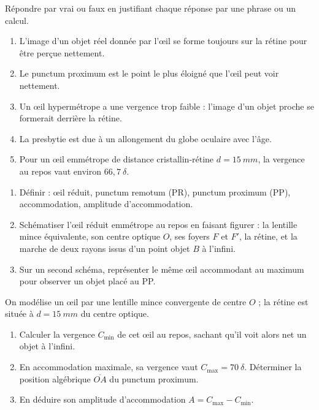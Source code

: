 \documentclass[11pt]{article}
\begin{document}
\begin{exercice}
Répondre par vrai ou faux en justifiant chaque réponse par une phrase ou un calcul.
\begin{enumerate}
\item L'image d'un objet réel donnée par l'œil se forme toujours sur la rétine pour être perçue nettement.
\item Le punctum proximum est le point le plus éloigné que l'œil peut voir nettement.
\item Un œil hypermétrope a une vergence trop faible : l'image d'un objet proche se formerait derrière la rétine.
\item La presbytie est due à un allongement du globe oculaire avec l'âge.
\item Pour un œil emmétrope de distance cristallin-rétine $d = \SI{15}{mm}$, la vergence au repos vaut environ $66,7\ \delta$.
\end{enumerate}
\end{exercice}

\begin{exercice}
\begin{enumerate}
\item Définir : œil réduit, punctum remotum (PR), punctum proximum (PP), accommodation, amplitude d'accommodation.
\item Schématiser l'œil réduit emmétrope au repos en faisant figurer : la lentille mince équivalente, son centre optique $O$, ses foyers $F$ et $F'$, la rétine, et la marche de deux rayons issus d'un point objet $B$ à l'infini.
\item Sur un second schéma, représenter le même œil accommodant au maximum pour observer un objet placé au PP.
\end{enumerate}
\end{exercice}

\begin{exercice}
On modélise un œil par une lentille mince convergente de centre $O$ ; la rétine est située à $d = \SI{15}{mm}$ du centre optique.
\begin{enumerate}
\item Calculer la vergence $C_{\min}$ de cet œil au repos, sachant qu'il voit alors net un objet à l'infini.
\item En accommodation maximale, sa vergence vaut $C_{\max} = 70\ \delta$. Déterminer la position algébrique $\overline{OA}$ du punctum proximum.
\item En déduire son amplitude d'accommodation $A = C_{\max} - C_{\min}$.
\end{enumerate}
\end{exercice}
\end{document}
